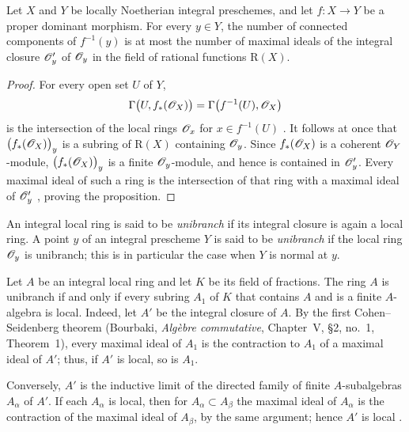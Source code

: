 \begin{proposition}[4.3.5]
\label{III.4.3.5}
Let $X$ and $Y$ be locally Noetherian integral preschemes, and let
$f:X\to Y$ be a proper dominant morphism.  For every $y\in Y$, the
number of connected components of $f^{-1}(y)$ is at most the number
of maximal ideals of the integral closure $\mathscr{O}'_y$ of
$\mathscr{O}_y$ in the field of rational functions $\mathrm{R}(X)$.
\end{proposition}

\begin{proof}
For every open set $U$ of $Y$,
\[
  \Gamma\bigl(U,f_*(\mathscr{O}_X)\bigr)
  =
  \Gamma\bigl(f^{-1}(U),\mathscr{O}_X\bigr)
\]
is the intersection of the local rings $\mathscr{O}_x$ for
$x\in f^{-1}(U)$ .  It follows at once that
$\bigl(f_*(\mathscr{O}_X)\bigr)_y$ is a subring of $\mathrm{R}(X)$ containing
$\mathscr{O}_y$.  Since $f_*(\mathscr{O}_X)$ is a coherent
$\mathscr{O}_Y$-module, $\bigl(f_*(\mathscr{O}_X)\bigr)_y$ is a finite
$\mathscr{O}_y$-module, and hence is contained in $\mathscr{O}'_y$.
Every maximal ideal of such a ring is the intersection of that ring
with a maximal ideal of $\mathscr{O}'_y$
\cite[vol.~I, pp.~257 and 259]{I-13}, proving the proposition.
\end{proof}

\begin{definition}[4.3.6]
\label{III.4.3.6}
An integral local ring is said to be \emph{unibranch} if its integral
closure is again a local ring.  A point $y$ of an integral prescheme
$Y$ is said to be \emph{unibranch} if the local ring $\mathscr{O}_y$ is
unibranch; this is in particular the case when $Y$ is normal at
$y$.
\end{definition}

Let $A$ be an integral local ring and let $K$ be its field of
fractions.  The ring $A$ is unibranch if and only if every subring
$A_1$ of $K$ that contains $A$ and is a finite $A$-algebra is
local.  Indeed, let $A'$ be the integral closure of $A$.  By the
first Cohen--Seidenberg theorem (Bourbaki, \emph{Alg\`ebre
commutative}, Chapter~V, \S2, no.~1, Theorem~1), every maximal ideal
of $A_1$ is the contraction to $A_1$ of a maximal ideal of $A'$;
thus, if $A'$ is local, so is $A_1$.


Conversely, $A'$ is the inductive limit of the directed family of
finite $A$-subalgebras $A_\alpha$ of $A'$.  If each $A_\alpha$ is
local, then for $A_\alpha\subset A_\beta$ the maximal ideal of
$A_\alpha$ is the contraction of the maximal ideal of $A_\beta$, by
the same argument; hence $A'$ is local
.

